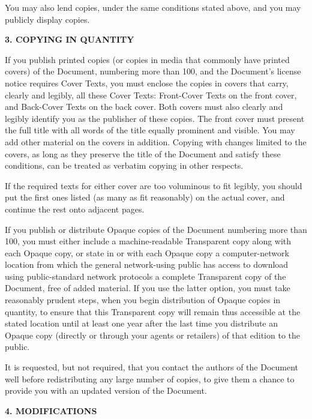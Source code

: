 \documentclass[a4paper,11pt,oneside]{book}
\begin{document}
You may also lend copies, under the same conditions stated above, and
you may publicly display copies.


\begin{center}
	{\Large\bf 3. COPYING IN QUANTITY\par}
\end{center}


If you publish printed copies (or copies in media that commonly have
printed covers) of the Document, numbering more than 100, and the
Document's license notice requires Cover Texts, you must enclose the
copies in covers that carry, clearly and legibly, all these Cover
Texts: Front-Cover Texts on the front cover, and Back-Cover Texts on
the back cover.  Both covers must also clearly and legibly identify
you as the publisher of these copies.  The front cover must present
the full title with all words of the title equally prominent and
visible.  You may add other material on the covers in addition.
Copying with changes limited to the covers, as long as they preserve
the title of the Document and satisfy these conditions, can be treated
as verbatim copying in other respects.

If the required texts for either cover are too voluminous to fit
legibly, you should put the first ones listed (as many as fit
reasonably) on the actual cover, and continue the rest onto adjacent
pages.

If you publish or distribute Opaque copies of the Document numbering
more than 100, you must either include a machine-readable Transparent
copy along with each Opaque copy, or state in or with each Opaque copy
a computer-network location from which the general network-using
public has access to download using public-standard network protocols
a complete Transparent copy of the Document, free of added material.
If you use the latter option, you must take reasonably prudent steps,
when you begin distribution of Opaque copies in quantity, to ensure
that this Transparent copy will remain thus accessible at the stated
location until at least one year after the last time you distribute an
Opaque copy (directly or through your agents or retailers) of that
edition to the public.

It is requested, but not required, that you contact the authors of the
Document well before redistributing any large number of copies, to give
them a chance to provide you with an updated version of the Document.


\begin{center}
	{\Large\bf 4. MODIFICATIONS\par}
\end{center}
\end{document}
